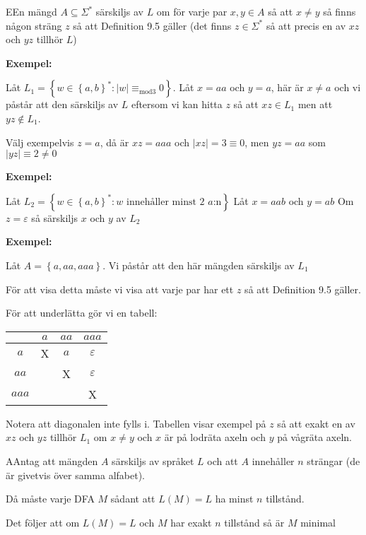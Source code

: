 \par\bigskip
\begin{theo}
  EEn mängd $A\subseteq\Sigma^*$ särskiljs av $L$ om för varje par $x,y\in A$ så att $x\neq y$ så finns någon sträng $z$ så att Definition 9.5 gäller (det finns $z\in\Sigma^*$ så att precis en av $xz$ och $yz$ tillhör $L$)
\end{theo}
\par\bigskip
\noindent\textbf{Exempel:}\par
\noindent Låt $L_1 = \left\{w\in\left\{a,b\right\}^*:\left|w\right|\equiv_{\text{mod}3} 0\right\}$. Låt $x=aa$ och $y=a$, här är $x\neq a$ och vi påstår att den särskiljs av $L$ eftersom vi kan hitta $z$ så att $xz\in L_1$ men att $yz\notin L_1$.\par
\noindent Välj exempelvis $z=a$, då är $xz=aaa$ och $\left|xz\right|=3\equiv0$, men $yz=aa$ som $\left|yz\right|\equiv2\neq0$
\par\bigskip
\noindent\textbf{Exempel:}\par
\noindent Låt $L_2 = \left\{w\in\left\{a,b\right\}^*: w\text{ innehåller minst 2 } a\text{:n}\right\}$ Låt $x=aab$ och  $y=ab$
\noindent Om $z=\varepsilon$ så särskiljs $x$ och $y$ av $L_2$
\par\bigskip
\noindent\textbf{Exempel:}\par
\noindent Låt $A=\left\{a,aa,aaa\right\}$. Vi påstår att den här mängden särskiljs av $L_1$\par
\noindent För att visa detta måste vi visa att varje par har ett $z$ så att Definition 9.5 gäller.\par
\noindent För att underlätta gör vi en tabell:
\par\bigskip
\begin{center}
  \begin{tabular}{c|c|c|c}
    &$a$&$aa$&$aaa$\\
    \hline
    $a$&X&$a$&$\varepsilon$\\
    $aa$&&X&$\varepsilon$\\
    $aaa$&&&X
  \end{tabular}
\end{center}
\par\bigskip
\noindent Notera att diagonalen inte fylls i. Tabellen visar exempel på $z$ så att exakt en av $xz$ och $yz$ tillhör $L_1$ om $x\neq y$ och $x$ är på lodräta axeln och $y$ på vågräta axeln.
\newpage
\begin{theo}
  AAntag att mängden $A$ särskiljs av språket $L$ och att $A$ innehåller $n$ strängar (de är givetvis över samma alfabet).\par
  \noindent Då måste varje DFA $M$ sådant att $L(M)=L$ ha minst $n$ tillstånd.
  \par\bigskip
  \noindent Det följer att om $L(M)=L$ och $M$ har exakt $n$ tillstånd så är $M$ minimal
\end{theo}
